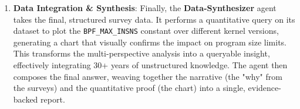 \begin{enumerate}
\item \textbf{Data Integration \& Synthesis}: Finally, the \textbf{Data-Synthesizer} agent takes the final, structured survey data. It performs a quantitative query on its dataset to plot the \texttt{BPF\_MAX\_INSNS} constant over different kernel versions, generating a chart that visually confirms the impact on program size limits. This transforms the multi-perspective analysis into a queryable insight, effectively integrating 30+ years of unstructured knowledge. The agent then composes the final answer, weaving together the narrative (the "why" from the surveys) and the quantitative proof (the chart) into a single, evidence-backed report.
\end{enumerate}
